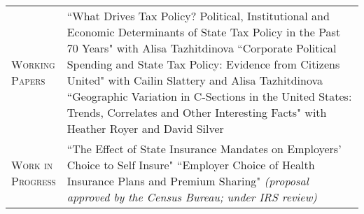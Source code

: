 \documentclass[11pt]{article}
\begin{document}
\begin{tabularx}{\textwidth}{@{}Y Z@{}}
	\textsc{Working \newline Papers} \vspace{20pt} & 
	``What Drives Tax Policy? Political, Institutional and Economic Determinants \newline of State Tax Policy in the Past 70 Years" with Alisa Tazhitdinova \href{https://papers.ssrn.com/sol3/papers.cfm?abstract_id=4035979}{}
	\vspace{15pt} \newline
	``Corporate Political Spending and State Tax Policy: Evidence from Citizens United" \newline with Cailin Slattery and Alisa Tazhitdinova
	\vspace{15pt} \newline
	``Geographic Variation in C-Sections in the United States: Trends, Correlates \newline and Other Interesting Facts" with Heather Royer and David Silver \href{https://irle.berkeley.edu/files/2022/05/rrs_csection_version_davefest.pdf}{}
    \\[20pt]
    
    \textsc{Work in \newline Progress} \vspace{20pt} & 
    ``The Effect of State Insurance Mandates on Employers' Choice to Self Insure"
     \vspace{15pt} \newline
    ``Employer Choice of Health Insurance Plans and Premium Sharing" \newline
    \textit{(proposal approved by the Census Bureau; under IRS review)} 
    \\[20pt]


\end{tabularx}
\end{document}
